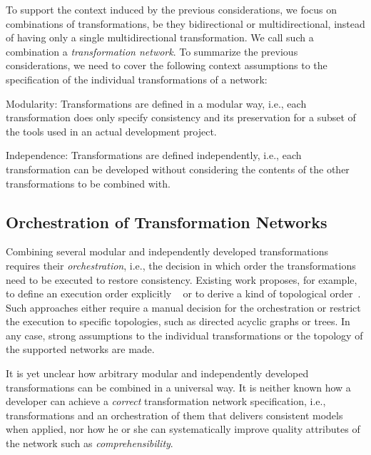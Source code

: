 To support the context induced by the previous considerations, we focus on combinations of transformations, be they bidirectional or multidirectional, instead of having only a single multidirectional transformation.
We call such a combination a \emph{transformation network}.
To summarize the previous considerations, we need to cover the following context assumptions to the specification of the individual transformations of a network:
\begin{properdescription}
    \item[Modularity:] Transformations are defined in a modular way, i.e., each transformation does only specify consistency and its preservation for a subset of the tools used in an actual development project.
    \item[Independence:] Transformations are defined independently, i.e., each transformation can be developed without considering the contents of the other transformations to be combined with.
\end{properdescription}


\subsection{Orchestration of Transformation Networks}
\label{chap:introduction:consistency:orchestration}

Combining several modular and independently developed transformations requires their \emph{orchestration}, i.e., the decision in which order the transformations need to be executed to restore consistency.
Existing work proposes, for example, to define an execution order explicitly ~\cite{pilgrim2008a, vanhooff2007UniTI-MODELS} or to derive a kind of topological order~\cite{stevens2020BidirectionalTransformationLarge-SoSym}.
Such approaches either require a manual decision for the orchestration or restrict the execution to specific topologies, such as directed acyclic graphs or trees. %
In any case, strong assumptions to the individual transformations or the topology of the supported networks are made.

It is yet unclear how arbitrary modular and independently developed transformations can be combined in a universal way.
It is neither known how a developer can achieve a \emph{correct} transformation network specification, i.e., transformations and an orchestration of them that delivers consistent models when applied, nor how he or she can systematically improve quality attributes of the network such as %
\emph{comprehensibility}.

